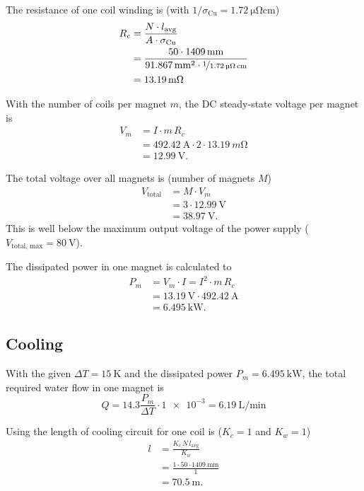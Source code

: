 \documentclass[10pt,a4paper,noendnumber=true]{scrartcl}
\begin{document}
The resistance of one coil winding is (with $1/\sigma_\text{Cu}=\SI{1.72}{\micro\ohm\cm}$)
\begin{align}
R_c&=\frac{N\cdot l_\text{avg}}{A\cdot\sigma_\text{Cu}} \\
&= \frac{50 \cdot \SI{1409}{\mm}}{\SI{91.867}{\mm\squared}\cdot \nicefrac{1}{\SI{1.72}{\micro\ohm\cm}}} \nonumber\\
&= \SI{13.19}{\milli\ohm} \nonumber
\end{align}

With the number of coils per magnet $m$, the DC steady-state voltage per magnet is
\begin{align}
V_m &= I \cdot m\,R_c \\
&= \SI{492.42}{\ampere} \cdot 2 \cdot \SI{13.19}{m\ohm} \nonumber\\
&= \SI{12.99}{\volt}.\nonumber
\end{align}

The total voltage over all magnets is (number of magnets $M$)
\begin{align}
V_\text{total} &= M \cdot V_m \\
&= 3 \cdot \SI{12.99}{\volt} \nonumber\\
&= \SI{38.97}{\volt}.\nonumber
\end{align}
This is well below the maximum output voltage of the power supply ($V_\text{total, max}=\SI{80}{\volt}$).

The dissipated power in one magnet is calculated to
\begin{align}
P_m &= V_m \cdot I = I^2 \cdot m\,R_c \\
&= \SI{13.19}{\volt} \cdot \SI{492.42}{\ampere} \nonumber\\
&= \SI{6.495}{\kilo\watt}.\nonumber
\end{align}

\subsection{Cooling}
With the given $\Delta T=\SI{15}{\kelvin}$ and the dissipated power $P_m=\SI{6.495}{\kilo\watt}$, the total required water flow in one magnet is
\begin{equation}
    Q = 14.3 \frac{P_m}{\Delta T} \cdot \num{1e-3} = \SI{6.19}{\liter\per\minute}
\end{equation}

Using the length of cooling circuit for one coil is ($K_c=1$ and $K_w=1$)
\begin{align}
    l &= \frac{K_c\,N\,l_\text{avg}}{K_w} \\
    &= \frac{1\cdot50\cdot\SI{1409}{\mm}}{1} \nonumber\\ 
    &= \SI{70.5}{\meter}. \nonumber
\end{align}
\end{document}
